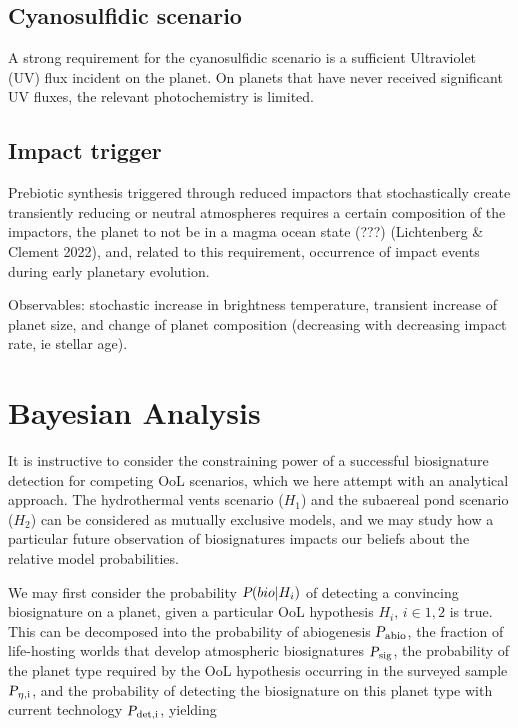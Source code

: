 \documentclass[twocolumn]{aastex631}
\begin{document}
\subsection{Cyanosulfidic scenario}
A strong requirement for the cyanosulfidic scenario is a sufficient Ultraviolet (UV) flux incident on the planet.
On planets that have never received significant UV fluxes, the relevant photochemistry is limited.

\subsection{Impact trigger}
Prebiotic synthesis triggered through reduced impactors that stochastically create transiently reducing or neutral atmospheres requires a certain composition of the impactors, the planet to not be in a magma ocean state (???) (Lichtenberg \& Clement 2022), and, related to this requirement, occurrence of impact events during early planetary evolution.

Observables: stochastic increase in brightness temperature, transient increase of planet size, and change of planet composition (decreasing with decreasing impact rate, ie stellar age).

\section{Bayesian Analysis}
It is instructive to consider the constraining power of a successful biosignature detection for competing OoL scenarios, which we here attempt with an analytical approach.
The hydrothermal vents scenario ($H_1$) and the subaereal pond scenario ($H_2$) can be considered as mutually exclusive models, and we may study how a particular future observation of biosignatures impacts our beliefs about the relative model probabilities.

We may first consider the probability $\textsl{P}(bio|H_i)$ of detecting a convincing biosignature on a planet, given a particular OoL hypothesis $H_i, \, i \in 1, 2$ is true.
This can be decomposed into the probability of abiogenesis $\textsl{P}_\mathrm{abio}$, the fraction of life-hosting worlds that develop atmospheric biosignatures $\textsl{P}_\mathrm{sig}$, the probability of the planet type required by the OoL hypothesis occurring in the surveyed sample $\textsl{P}_\mathrm{\eta, i}$, and the probability of detecting the biosignature on this planet type with current technology $\textsl{P}_\mathrm{det, i}$, yielding
\end{document}
